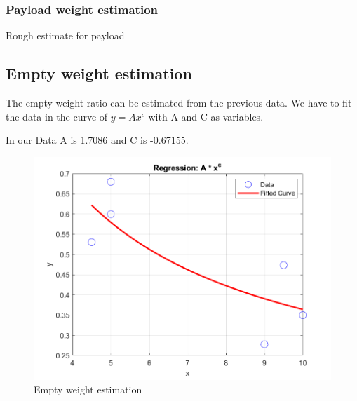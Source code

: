 \documentclass[12 pt]{article}
\begin{document}
\subsubsection{Payload weight estimation}
Rough estimate for payload
\begin{table}[h]
\centering
{}
\end{table}

\hfill


\subsection{Empty weight estimation}
The empty weight ratio can be estimated from the previous data. We have to fit the data in the curve of $y = A x^c$ with A and C as variables.

In our Data A is 1.7086 and C is -0.67155.

\begin{figure}[h]
    \centering
    \includegraphics[width = \linewidth]{Regression.png}
    \caption{Empty weight estimation}
    \label{fig:enter-label}
\end{figure}
\end{document}

